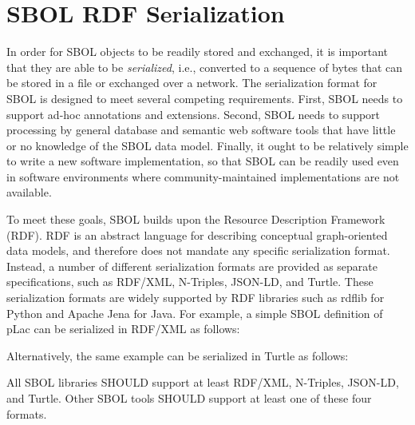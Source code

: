 \section{SBOL RDF Serialization}
\label{sec:serialization}

In order for SBOL objects to be readily stored and exchanged, it is important that they are able to be {\em serialized}, i.e., converted to a sequence of bytes that can be stored in a file or exchanged over a network.  The serialization format for SBOL is designed to meet several competing requirements. 
First, SBOL needs to support ad-hoc annotations and extensions. 
Second, SBOL needs to support processing by general database and semantic web software tools that have little or no knowledge of the SBOL data model. 
Finally, it ought to be relatively simple to write a new software implementation, so that SBOL can be readily used even in software environments where community-maintained implementations are not available.

To meet these goals, SBOL builds upon the Resource Description Framework (RDF).  RDF is an abstract language for describing conceptual graph-oriented data models, and therefore does not mandate any specific serialization format.  Instead, a number of different serialization formats are provided as separate specifications, such as RDF/XML, N-Triples, JSON-LD, and Turtle.  These serialization formats are widely supported by RDF libraries such as rdflib for Python and Apache Jena for Java.   For example, a simple SBOL definition of pLac can be serialized in RDF/XML as follows:

\vspace{3mm}

Alternatively, the same example can be serialized in Turtle as follows:

\vspace{3mm}

All SBOL libraries SHOULD support at least RDF/XML, N-Triples, JSON-LD, and Turtle.
Other SBOL tools SHOULD support at least one of these four formats.
